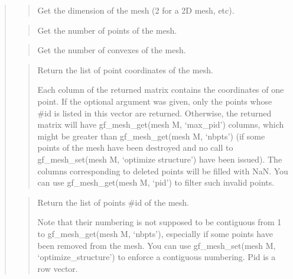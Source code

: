 \documentclass[a4paper,11pt,english]{sphinxmanual}
\begin{document}
\begin{quote}

\begin{quote}

Get the dimension of the mesh (2 for a 2D mesh, etc).
\end{quote}

\begin{quote}

Get the number of points of the mesh.
\end{quote}

\begin{quote}

Get the number of convexes of the mesh.
\end{quote}

\begin{quote}

Return the list of point coordinates of the mesh.

Each column of the returned matrix contains the coordinates of one
point. If the optional argument  was given, only the points
whose \#id is listed in this vector are returned. Otherwise, the
returned matrix will have gf\_mesh\_get(mesh M, ‘max\_pid’) columns, which might
be greater than gf\_mesh\_get(mesh M, ‘nbpts’) (if some points of the mesh have
been destroyed and no call to gf\_mesh\_set(mesh M, ‘optimize structure’) have
been issued). The columns corresponding to deleted points will be
filled with NaN. You can use gf\_mesh\_get(mesh M, ‘pid’) to filter such invalid
points.
\end{quote}

\begin{quote}

Return the list of points \#id of the mesh.

Note that their numbering is not supposed to be contiguous from
1 to gf\_mesh\_get(mesh M, ‘nbpts’),
especially if some points have been removed from the mesh. You
can use gf\_mesh\_set(mesh M, ‘optimize\_structure’) to enforce a contiguous
numbering. Pid is a row vector.
\end{quote}


\end{quote}
\end{document}
